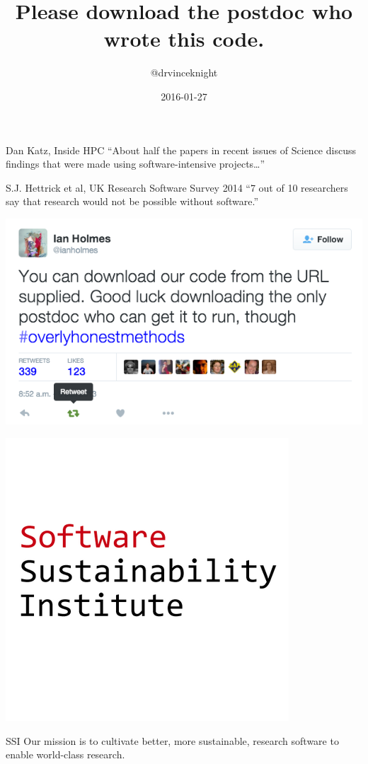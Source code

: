 \documentclass{beamer}
\title{Please download the postdoc who wrote this code.}
\author{@drvinceknight}
\date{2016-01-27}
\begin{document}
\begin{frame}
    \titlepage
\end{frame}

\begin{frame}
    \begin{block}{Dan Katz, Inside HPC}
        ``About half the papers in recent issues of Science discuss findings that
        were made using software-intensive projects\ldots''
    \end{block}

    \vspace{2cm}

    \begin{block}{S.J. Hettrick et al, UK Research Software Survey 2014}
        ``7 out of 10 researchers say that research would not be possible
        without software.''
    \end{block}
\end{frame}

\begin{frame}
    \begin{center}
        \includegraphics[width=.7\textwidth]{img/tweet.png}
    \end{center}
\end{frame}

\begin{frame}
    \begin{center}
        \includegraphics[width=.5\textwidth]{img/ssi.png}
    \end{center}

    \pause

    \begin{block}{SSI}
        Our mission is to cultivate better, more sustainable, research software to
        enable world-class research.
    \end{block}
\end{frame}
\end{document}
